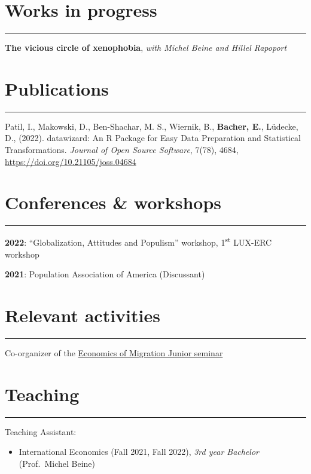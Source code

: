 \documentclass{article}
\newcommand{\sectionline}{%
  \vspace{-0.5cm}%
  \par\noindent\rule{\textwidth}{0.4pt}%
  \vspace{0.3cm}%
}
\let\xsection=\section
\renewcommand{\section}[1]{%
  \vspace{0.4cm}%
  \xsection*{#1}%
  \sectionline%
}
\def\tightlist{}
\begin{document}
\hypertarget{works-in-progress}{%
\section{Works in progress}\label{works-in-progress}}

\textbf{The vicious circle of xenophobia}, \emph{with Michel Beine and
Hillel Rapoport}

\hypertarget{publications}{%
\section{Publications}\label{publications}}

Patil, I., Makowski, D., Ben-Shachar, M. S., Wiernik, B.,
\textbf{Bacher, E.}, Lüdecke, D., (2022). datawizard: An R Package for
Easy Data Preparation and Statistical Transformations. \emph{Journal of
Open Source Software}, 7(78), 4684,
\url{https://doi.org/10.21105/joss.04684}

\hypertarget{conferences-workshops}{%
\section{Conferences \& workshops}\label{conferences-workshops}}

\textbf{2022}: ``Globalization, Attitudes and Populism'' workshop,
1\textsuperscript{st} LUX-ERC workshop

\textbf{2021}: Population Association of America (Discussant)

\hypertarget{relevant-activities}{%
\section{Relevant activities}\label{relevant-activities}}

Co-organizer of the
\href{https://sites.google.com/view/the-economics-of-migration}{Economics
of Migration Junior seminar}

\hypertarget{teaching}{%
\section{Teaching}\label{teaching}}

Teaching Assistant:

\begin{itemize}
\tightlist
\item
  International Economics (Fall 2021, Fall 2022), \emph{3rd year
  Bachelor} (Prof.~Michel Beine)
\end{itemize}
\end{document}
